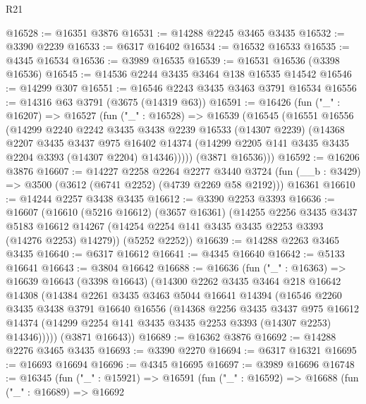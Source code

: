 \begin{lexlean}{R21}
\begin{coremodule}
@16528 := @16351 @3876
@16531 := @14288 @2245 @3465 @3435
@16532 := @3390 @2239
@16533 := @6317 @16402
@16534 := @16532 @16533
@16535 := @4345 @16534
@16536 := @3989 @16535
@16539 := @16531 @16536 (@3398 @16536)
@16545 := @14536 @2244 @3435 @3464 @138 @16535 @14542
@16546 := @14299 @307
@16551 := @16546 @2243 @3435 @3463 @3791 @16534
@16556 := @14316 @63 @3791 (@3675 (@14319 @63))
@16591 := @16426
    (fun ("_" : @16207) =>
    @16527
      (fun ("_" : @16528) =>
      @16539
        (@16545
          (@16551
            @16556
            (@14299
              @2240
              @2242
              @3435
              @3438
              @2239
              @16533
              (@14307 @2239)
              (@14368
                @2207
                @3435
                @3437
                @975
                @16402
                @14374
                (@14299 @2205 @141 @3435 @3435 @2204 @3393 (@14307 @2204) @14346)))))
        (@3871 @16536)))
@16592 := @16206 @3876
@16607 := @14227
    @2258
    @2264
    @2277
    @3440
    @3724
    (fun (__b : @3429) => @3500 (@3612 (@6741 @2252) (@4739 @2269 @58 @2192)))
    @16361
@16610 := @14244 @2257 @3438 @3435
@16612 := @3390 @2253 @3393
@16636 := @16607
    (@16610
      (@5216 @16612)
      (@3657 @16361)
      (@14255
        @2256
        @3435
        @3437
        @5183
        @16612
        @14267
        (@14254 @2254 @141 @3435 @3435 @2253 @3393 (@14276 @2253) @14279))
      (@5252 @2252))
@16639 := @14288 @2263 @3465 @3435
@16640 := @6317 @16612
@16641 := @4345 @16640
@16642 := @5133 @16641
@16643 := @3804 @16642
@16688 := @16636
    (fun ("_" : @16363) =>
    @16639
      @16643
      (@3398 @16643)
      (@14300
        @2262
        @3435
        @3464
        @218
        @16642
        @14308
        (@14384
          @2261
          @3435
          @3463
          @5044
          @16641
          @14394
          (@16546
            @2260
            @3435
            @3438
            @3791
            @16640
            @16556
            (@14368
              @2256
              @3435
              @3437
              @975
              @16612
              @14374
              (@14299 @2254 @141 @3435 @3435 @2253 @3393 (@14307 @2253) @14346)))))
      (@3871 @16643))
@16689 := @16362 @3876
@16692 := @14288 @2276 @3465 @3435
@16693 := @3390 @2270
@16694 := @6317 @16321
@16695 := @16693 @16694
@16696 := @4345 @16695
@16697 := @3989 @16696
@16748 := @16345
    (fun ("_" : @15921) =>
    @16591
      (fun ("_" : @16592) =>
      @16688
        (fun ("_" : @16689) =>
        @16692

\end{coremodule}
\end{lexlean}
